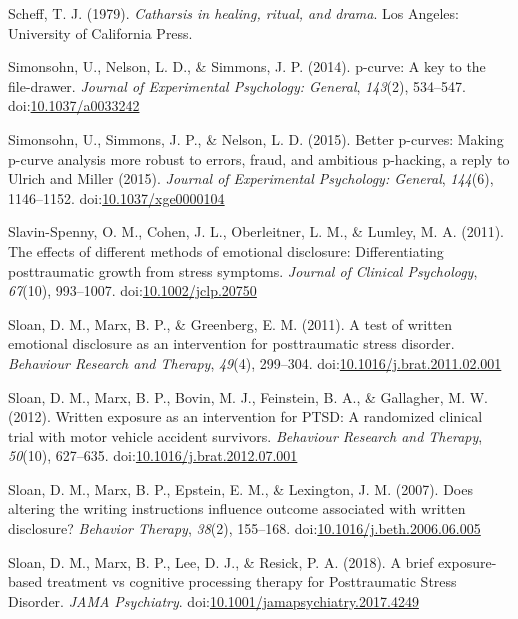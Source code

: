 \documentclass[man, mask]{apa6}
\theoremstyle{definition}
\theoremstyle{definition}
\theoremstyle{definition}
\theoremstyle{remark}
\begin{document}
\hypertarget{ref-Scheff1979}{}
Scheff, T. J. (1979). \emph{Catharsis in healing, ritual, and drama}.
Los Angeles: University of California Press.

\hypertarget{ref-Simonsohn2014}{}
Simonsohn, U., Nelson, L. D., \& Simmons, J. P. (2014). p-curve: A key
to the file-drawer. \emph{Journal of Experimental Psychology: General},
\emph{143}(2), 534--547.
doi:\href{https://doi.org/10.1037/a0033242}{10.1037/a0033242}

\hypertarget{ref-Simonsohn2015}{}
Simonsohn, U., Simmons, J. P., \& Nelson, L. D. (2015). Better p-curves:
Making p-curve analysis more robust to errors, fraud, and ambitious
p-hacking, a reply to Ulrich and Miller (2015). \emph{Journal of
Experimental Psychology: General}, \emph{144}(6), 1146--1152.
doi:\href{https://doi.org/10.1037/xge0000104}{10.1037/xge0000104}

\hypertarget{ref-Slavin-Spenny2011}{}
Slavin-Spenny, O. M., Cohen, J. L., Oberleitner, L. M., \& Lumley, M. A.
(2011). The effects of different methods of emotional disclosure:
Differentiating posttraumatic growth from stress symptoms. \emph{Journal
of Clinical Psychology}, \emph{67}(10), 993--1007.
doi:\href{https://doi.org/10.1002/jclp.20750}{10.1002/jclp.20750}

\hypertarget{ref-Sloan2011a}{}
Sloan, D. M., Marx, B. P., \& Greenberg, E. M. (2011). A test of written
emotional disclosure as an intervention for posttraumatic stress
disorder. \emph{Behaviour Research and Therapy}, \emph{49}(4), 299--304.
doi:\href{https://doi.org/10.1016/j.brat.2011.02.001}{10.1016/j.brat.2011.02.001}

\hypertarget{ref-Sloan2012}{}
Sloan, D. M., Marx, B. P., Bovin, M. J., Feinstein, B. A., \& Gallagher,
M. W. (2012). Written exposure as an intervention for PTSD: A randomized
clinical trial with motor vehicle accident survivors. \emph{Behaviour
Research and Therapy}, \emph{50}(10), 627--635.
doi:\href{https://doi.org/10.1016/j.brat.2012.07.001}{10.1016/j.brat.2012.07.001}

\hypertarget{ref-Sloan2007}{}
Sloan, D. M., Marx, B. P., Epstein, E. M., \& Lexington, J. M. (2007).
Does altering the writing instructions influence outcome associated with
written disclosure? \emph{Behavior Therapy}, \emph{38}(2), 155--168.
doi:\href{https://doi.org/10.1016/j.beth.2006.06.005}{10.1016/j.beth.2006.06.005}

\hypertarget{ref-Sloan2018}{}
Sloan, D. M., Marx, B. P., Lee, D. J., \& Resick, P. A. (2018). A brief
exposure-based treatment vs cognitive processing therapy for
Posttraumatic Stress Disorder. \emph{JAMA Psychiatry}.
doi:\href{https://doi.org/10.1001/jamapsychiatry.2017.4249}{10.1001/jamapsychiatry.2017.4249}
\end{document}
